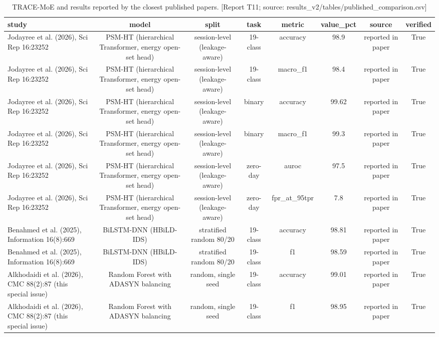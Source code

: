 \begin{table}[htbp]
\centering
\caption{TRACE-MoE and results reported by the closest published papers. [Report T11; source: results\_v2/tables/published\_comparison.csv]}
\label{tab:published_comparison}
\begin{tabular}{lccccccc}
\toprule
study & model & split & task & metric & value\_pct & source & verified \\
\midrule
Jodayree et al. (2026), Sci Rep 16:23252 & PSM-HT (hierarchical Transformer, energy open-set head) & session-level (leakage-aware) & 19-class & accuracy & 98.9 & reported in paper & True \\
Jodayree et al. (2026), Sci Rep 16:23252 & PSM-HT (hierarchical Transformer, energy open-set head) & session-level (leakage-aware) & 19-class & macro\_f1 & 98.4 & reported in paper & True \\
Jodayree et al. (2026), Sci Rep 16:23252 & PSM-HT (hierarchical Transformer, energy open-set head) & session-level (leakage-aware) & binary & accuracy & 99.62 & reported in paper & True \\
Jodayree et al. (2026), Sci Rep 16:23252 & PSM-HT (hierarchical Transformer, energy open-set head) & session-level (leakage-aware) & binary & macro\_f1 & 99.3 & reported in paper & True \\
Jodayree et al. (2026), Sci Rep 16:23252 & PSM-HT (hierarchical Transformer, energy open-set head) & session-level (leakage-aware) & zero-day & auroc & 97.5 & reported in paper & True \\
Jodayree et al. (2026), Sci Rep 16:23252 & PSM-HT (hierarchical Transformer, energy open-set head) & session-level (leakage-aware) & zero-day & fpr\_at\_95tpr & 7.8 & reported in paper & True \\
Benahmed et al. (2025), Information 16(8):669 & BiLSTM-DNN (HBiLD-IDS) & stratified random 80/20 & 19-class & accuracy & 98.81 & reported in paper & True \\
Benahmed et al. (2025), Information 16(8):669 & BiLSTM-DNN (HBiLD-IDS) & stratified random 80/20 & 19-class & f1 & 98.59 & reported in paper & True \\
Alkhodaidi et al. (2026), CMC 88(2):87 (this special issue) & Random Forest with ADASYN balancing & random, single seed & 19-class & accuracy & 99.01 & reported in paper & True \\
Alkhodaidi et al. (2026), CMC 88(2):87 (this special issue) & Random Forest with ADASYN balancing & random, single seed & 19-class & f1 & 98.95 & reported in paper & True \\

\end{tabular}
\end{table}
